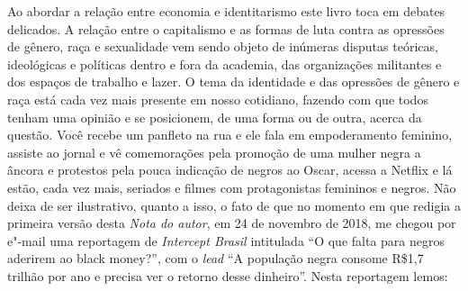 Ao abordar a relação entre economia e identitarismo este livro toca em
debates delicados. A relação entre o capitalismo e as formas de luta
contra as opressões de gênero, raça e sexualidade vem sendo objeto de
inúmeras disputas teóricas, ideológicas e políticas dentro e fora da
academia, das organizações militantes e dos espaços de trabalho e lazer.
O tema da identidade e das opressões de gênero e raça está cada vez mais
presente em nosso cotidiano, fazendo com que todos tenham uma opinião e
se posicionem, de uma forma ou de outra, acerca da questão. Você recebe
um panfleto na rua e ele fala em empoderamento feminino, assiste ao
jornal e vê comemorações pela promoção de uma mulher negra a âncora e
protestos pela pouca indicação de negros ao Oscar, acessa a Netflix e lá
estão, cada vez mais, seriados e filmes com protagonistas femininos e
negros. Não deixa de ser ilustrativo, quanto a isso, o fato de que no
momento em que redigia a primeira versão desta \emph{Nota do autor}, em
24 de novembro de 2018, me chegou por e"-mail uma reportagem de
\emph{Intercept Brasil} intitulada ``O que falta para negros aderirem ao
black money?'', com o \emph{lead} ``A população negra consome R\$1,7
trilhão por ano e precisa ver o retorno desse dinheiro''. Nesta
reportagem lemos:

